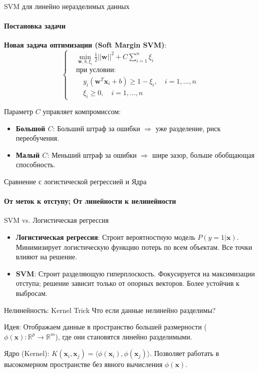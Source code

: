 \documentclass[notheorems, handout]{beamer}
\begin{document}
\begin{frame}{SVM для линейно неразделимых данных}
  \framesubtitle{Постановка задачи}
  \textbf{Новая задача оптимизации (Soft Margin SVM)}:
  \[
    \begin{cases}
      & \min_{\mathbf{w}, b, \xi_i} \frac{1}{2} ||\mathbf{w}||^2 + C
      \sum_{i=1}^n \xi_i \\
      & \text{при условии:} \\
      & \quad y_i (\mathbf{w}^T \mathbf{x}_i + b) \geq 1 - \xi_i,
      \quad i = 1, \dots, n \\
      & \quad \xi_i \geq 0, \quad i = 1, \dots, n
    \end{cases}
  \]

  \alert{Параметр $C$} управляет компромиссом:
  \begin{itemize}
    \item \textbf{Большой $C$}: Больший штраф за ошибки $\Rightarrow$
      уже разделение, риск переобучения.
    \item \textbf{Малый $C$}: Меньший штраф за ошибки $\Rightarrow$
      шире зазор, больше обобщающая способность.
  \end{itemize}
\end{frame}

\begin{frame}{Сравнение с логистической регрессией и Ядра}
  \framesubtitle{От меток к отступу; От линейности к нелинейности}

  \begin{block}{SVM vs. Логистическая регрессия}
    \begin{itemize}
      \item \textbf{Логистическая регрессия}: Строит
        \alert{вероятностную} модель $P(y=1|\mathbf{x})$.
        Минимизирует \alert{логистическую функцию потерь} по всем
        объектам. Все точки влияют на решение.
      \item \textbf{SVM}: Строит \alert{разделяющую гиперплоскость}.
        Фокусируется на \alert{максимизации отступа}; решение зависит
        только от \alert{опорных векторов}. Более устойчив к выбросам.
    \end{itemize}
  \end{block}

  \begin{block}{Нелинейность: Kernel Trick}
    Что если данные нелинейно разделимы?

    Идея: Отображаем данные в пространство \alert{большей
    размерности} ($\phi(\mathbf{x}): \mathbb{R}^p \rightarrow
    \mathbb{R}^m$), где они становятся линейно разделимыми.

    \alert{Ядро (Kernel)}: $K(\mathbf{x}_i, \mathbf{x}_j) = \langle
    \phi(\mathbf{x}_i), \phi(\mathbf{x}_j) \rangle$. Позволяет
    работать в высокомерном пространстве \alert{без явного
    вычисления} $\phi(\mathbf{x})$.
  \end{block}
\end{frame}
\end{document}
